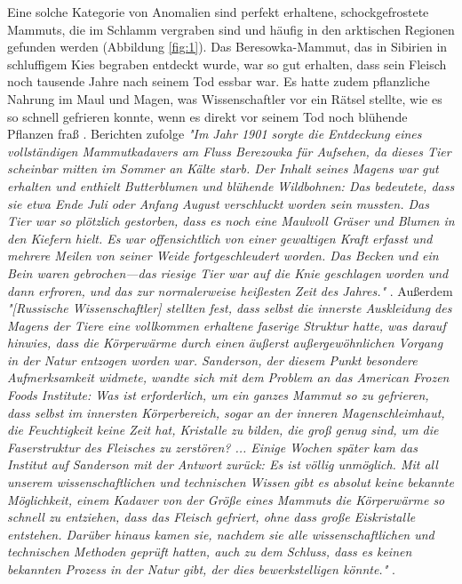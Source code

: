 \documentclass[10pt,twocolumn,letterpaper]{article}
\begin{document}
Eine solche Kategorie von Anomalien sind perfekt erhaltene, schockgefrostete Mammuts, die im Schlamm vergraben sind und häufig in den arktischen Regionen gefunden werden (Abbildung \ref{fig:1}). Das Beresowka-Mammut, das in Sibirien in schluffigem Kies begraben entdeckt wurde, war so gut erhalten, dass sein Fleisch noch tausende Jahre nach seinem Tod essbar war. Es hatte zudem pflanzliche Nahrung im Maul und Magen, was Wissenschaftler vor ein Rätsel stellte, wie es so schnell gefrieren konnte, wenn es direkt vor seinem Tod noch blühende Pflanzen fraß \cite{17}. Berichten zufolge \textit{"Im Jahr 1901 sorgte die Entdeckung eines vollständigen Mammutkadavers am Fluss Berezowka für Aufsehen, da dieses Tier scheinbar mitten im Sommer an Kälte starb. Der Inhalt seines Magens war gut erhalten und enthielt Butterblumen und blühende Wildbohnen: Das bedeutete, dass sie etwa Ende Juli oder Anfang August verschluckt worden sein mussten. Das Tier war so plötzlich gestorben, dass es noch eine Maulvoll Gräser und Blumen in den Kiefern hielt. Es war offensichtlich von einer gewaltigen Kraft erfasst und mehrere Meilen von seiner Weide fortgeschleudert worden. Das Becken und ein Bein waren gebrochen—das riesige Tier war auf die Knie geschlagen worden und dann erfroren, und das zur normalerweise heißesten Zeit des Jahres."} \cite{18}. Außerdem \textit{"[Russische Wissenschaftler] stellten fest, dass selbst die innerste Auskleidung des Magens der Tiere eine vollkommen erhaltene faserige Struktur hatte, was darauf hinwies, dass die Körperwärme durch einen äußerst außergewöhnlichen Vorgang in der Natur entzogen worden war. Sanderson, der diesem Punkt besondere Aufmerksamkeit widmete, wandte sich mit dem Problem an das American Frozen Foods Institute: Was ist erforderlich, um ein ganzes Mammut so zu gefrieren, dass selbst im innersten Körperbereich, sogar an der inneren Magenschleimhaut, die Feuchtigkeit keine Zeit hat, Kristalle zu bilden, die groß genug sind, um die Faserstruktur des Fleisches zu zerstören? ... Einige Wochen später kam das Institut auf Sanderson mit der Antwort zurück: Es ist völlig unmöglich. Mit all unserem wissenschaftlichen und technischen Wissen gibt es absolut keine bekannte Möglichkeit, einem Kadaver von der Größe eines Mammuts die Körperwärme so schnell zu entziehen, dass das Fleisch gefriert, ohne dass große Eiskristalle entstehen. Darüber hinaus kamen sie, nachdem sie alle wissenschaftlichen und technischen Methoden geprüft hatten, auch zu dem Schluss, dass es keinen bekannten Prozess in der Natur gibt, der dies bewerkstelligen könnte."} \cite{19}.
\end{document}
